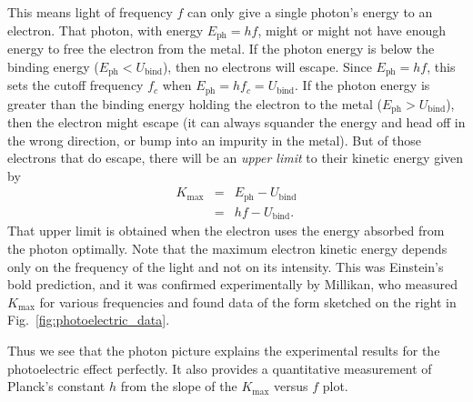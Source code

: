 This means light of frequency $f$ can only give a single photon's
energy to an electron.  That photon, with energy $E_\text{ph} =hf$,
might or might not have enough energy to free the electron from the
metal.  If the photon energy is below the binding energy ($E_\text{ph} < 
U_\text{bind}$), then no
electrons will escape.  Since $E_\text{ph} = hf$, this sets the
cutoff frequency $f_c$ when $E_\text{ph} = hf_c = U_\text{bind}$.  If the
photon energy is greater than the binding energy holding the electron
to the metal ($E_\text{ph} > U_\text{bind}$), then the electron might escape (it can always squander
the energy and head off in the wrong direction, or bump into an
impurity in the metal).  But of those electrons that do escape, there
will be an \textit{upper limit} to their kinetic energy given by
\begin{eqnarray}
K_\text{max} &=& E_\text{ph} - U_\text{bind} \nonumber \\
             &=& hf - U_\text{bind}.
\end{eqnarray}
That upper limit is obtained when the electron uses the energy
absorbed from the photon optimally.  Note that the maximum electron
kinetic energy depends only on the frequency of the light and not on
its intensity.  This was Einstein's bold prediction, and it was
confirmed experimentally by Millikan, who measured $K_\text{max}$ for
various frequencies and found data of the form sketched on the right
in Fig.~\ref{fig:photoelectric_data}.

Thus we see that the photon picture explains the experimental results
for the photoelectric effect perfectly.  It also provides a quantitative
measurement of Planck's constant $h$ from the slope of the $K_\text{max}$
versus $f$ plot.

